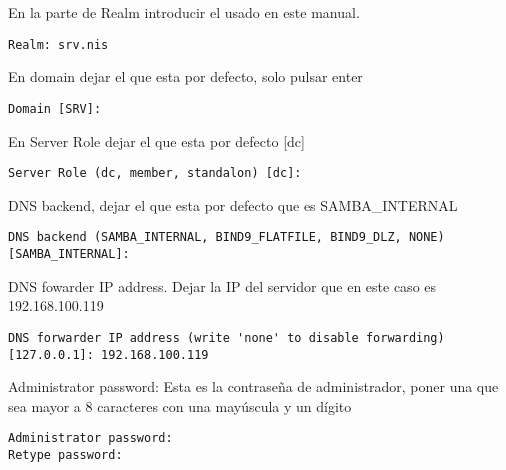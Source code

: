 \documentclass[../main.tex]{subfiles}
\begin{document}
\begin{enumerate}
        En la parte de Realm introducir el usado en este manual.

        \begin{listing}[H]
\begin{verbatim}
Realm: srv.nis
\end{verbatim}
\end{listing}

        En domain dejar el que esta por defecto, solo pulsar enter

        \begin{listing}[H]
\begin{verbatim}
Domain [SRV]:
\end{verbatim}
\end{listing}

        En Server Role dejar el que esta por defecto [dc]

        \begin{listing}[H]
\begin{verbatim}
Server Role (dc, member, standalon) [dc]:
\end{verbatim}
\end{listing}

        DNS backend, dejar el que esta por defecto que es SAMBA\_INTERNAL

        \begin{listing}[H]
\begin{verbatim}
DNS backend (SAMBA_INTERNAL, BIND9_FLATFILE, BIND9_DLZ, NONE) [SAMBA_INTERNAL]:
\end{verbatim}
\end{listing}

        DNS fowarder IP address. Dejar la IP del servidor que en este caso es 192.168.100.119

        \begin{listing}[H]
\begin{verbatim}
DNS forwarder IP address (write 'none' to disable forwarding) [127.0.0.1]: 192.168.100.119
\end{verbatim}
\end{listing}

        Administrator password: Esta es la contraseña de administrador, poner una que sea mayor a 8 caracteres con una mayúscula y un dígito

        \begin{listing}[H]
\begin{verbatim}
Administrator password:
Retype password:
\end{verbatim}
\end{listing}


\end{enumerate}
\end{document}
